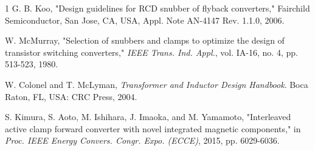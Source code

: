 \documentclass[lettersize,journal]{IEEEtran}
\begin{document}
\begin{thebibliography}{1}
G. B. Koo, "Design guidelines for RCD snubber of flyback converters," Fairchild Semiconductor, San Jose, CA, USA, Appl. Note AN-4147 Rev. 1.1.0, 2006.

W. McMurray, "Selection of snubbers and clamps to optimize the design of transistor switching converters," \textit{IEEE Trans. Ind. Appl.}, vol. IA-16, no. 4, pp. 513-523, 1980.

W. Colonel and T. McLyman, \textit{Transformer and Inductor Design Handbook}. Boca Raton, FL, USA: CRC Press, 2004.

S. Kimura, S. Aoto, M. Ishihara, J. Imaoka, and M. Yamamoto, "Interleaved active clamp forward converter with novel integrated magnetic components," in \textit{Proc. IEEE Energy Convers. Congr. Expo. (ECCE)}, 2015, pp. 6029-6036.

\end{thebibliography}

%
%
\vfill
\end{document}
